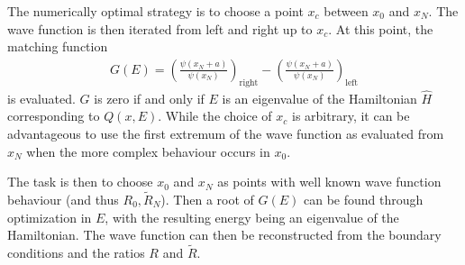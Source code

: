 The numerically optimal strategy is to choose a point $x_c$ between $x_0$ and $x_N$. The wave function is then iterated from left and right up to $x_c$. At this point, the matching function
\begin{align}
G(E) = \left( \frac{\psi(x_N+a)}{\psi(x_N)} \right)_\text{right} - \left( \frac{\psi(x_N+a)}{\psi(x_N)} \right)_\text{left}
\end{align}
is evaluated. $G$ is zero if and only if $E$ is an eigenvalue of the Hamiltonian $\hat H$ corresponding to $Q(x,E)$. While the choice of $x_c$ is arbitrary, it can be advantageous to use the first extremum of the wave function as evaluated from $x_N$ when the more complex behaviour occurs in $x_0$.

The task is then to choose $x_0$ and $x_N$ as points with well known wave function behaviour (and thus $R_0, \tilde R_N$). Then a root of $G(E)$ can be found through optimization in $E$, with the resulting energy being an eigenvalue of the Hamiltonian. The wave function can then be reconstructed from the boundary conditions and the ratios $R$ and $\tilde R$.

